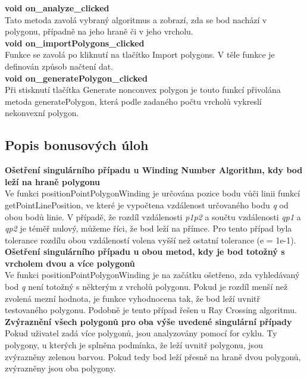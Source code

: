 \documentclass[a4paper,11pt,twoside]{article}
\begin{document}
\noindent\textbf{void on\_analyze\_clicked}\\
Tato metoda zavolá vybraný algoritmus a zobrazí, zda se bod nachází v polygonu, případně na jeho hraně či v jeho vrcholu.\\

\noindent\textbf{void on\_importPolygons\_clicked}\\
Funkce se zavolá po kliknutí na tlačítko Import polygons. V těle funkce je definován způsob načtení dat.\\

\noindent\textbf{void on\_generatePolygon\_clicked}\\
Při stisknutí tlačítka Generate nonconvex polygon je touto funkcí přivolána metoda generatePolygon, která podle zadaného počtu vrcholů vykreslí nekonvexní polygon.

\newpage
\vspace*{-1cm}
\subsection{Popis bonusových úloh}
\noindent\textbf{Ošetření singulárního případu u Winding Number Algorithm, kdy bod leží na hraně polygonu}\\
Ve funkci positionPointPolygonWinding je určována pozice bodu vůči linii funkcí getPointLinePosition, ve které je vypočtena vzdálenost určovaného bodu \textit{q} od obou bodů linie. V případě, že rozdíl vzdálenosti \textit{p1p2} a součtu vzdálenosti \textit{qp1} a \textit{qp2} je téměř nulový, můžeme říci, že bod leží na přímce.  Pro tento případ byla tolerance rozdílu obou vzdáleností volena vyšší než ostatní tolerance (e = 1e-1).\\

\noindent\textbf{Ošetření singulárního případu u obou metod, kdy je bod totožný s vrcholem dvou a více polygonů}\\
Ve funkci positionPointPolygonWinding je na začátku ošetřeno, zda vyhledávaný bod \textit{q} není totožný s některým z vrcholů polygonu. Pokud je rozdíl menší než zvolená mezní hodnota, je funkce vyhodnocena tak, že bod leží uvnitř testovaného polygonu. Podobně je tento případ řešen u Ray Crossing algoritmu.\\

\noindent\textbf{Zvýraznění všech polygonů pro oba výše uvedené singulární případy}\\
Pokud uživatel zadá více polygonů, jsou analyzovány pomocí for cyklu. Ty polygony, u kterých je splněna podmínka, že leží uvnitř polygonu, jsou zvýrazněny zelenou barvou. Pokud tedy bod leží přesně na hraně dvou polygonů, zvýrazněny jsou oba polygony.\\
\end{document}

